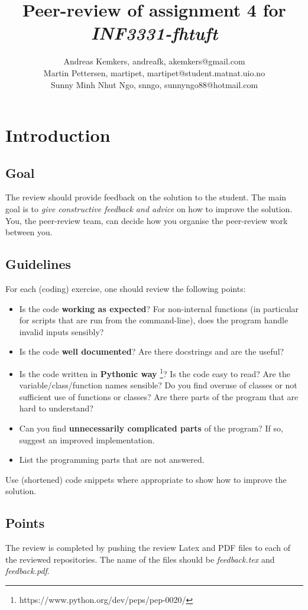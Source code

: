 \documentclass[a4paper]{article}
\title{Peer-review of assignment 4 for \textit{INF3331-fhtuft}}
\author{Andreas Kemkers, andreafk, {akemkers@gmail.com} \\
 		Martin Pettersen, martipet, {martipet@student.matnat.uio.no} \\
		Sunny Minh Nhut Ngo, snngo, {sunnyngo88@hotmail.com}}
\begin{document}
\maketitle

\section{Introduction}
\subsection{Goal}
The review should provide feedback on the solution to the student. The main goal is to \emph{give constructive feedback and advice} on how to improve the solution. You, the peer-review team, can decide how you organise the peer-review work between you. 

\subsection{Guidelines}\label{sec:general_review}
For each (coding) exercise, one should review the following points:

\begin{itemize}
  \item Is the code \textbf{working as expected}? For non-internal functions (in particular for scripts that are run from the command-line), does the program handle invalid inputs sensibly?
  \item Is the code \textbf{well documented}? Are there docstrings and are the useful?
  \item Is the code written in \textbf{Pythonic way} \footnote{https://www.python.org/dev/peps/pep-0020/}? Is the code easy to read? Are the variable/class/function names sensible? Do you find overuse of classes or not sufficient use of functions or classes? Are there parts of the program that are hard to understand? 
  \item Can you find \textbf{unnecessarily complicated parts} of the program? If so, suggest an improved implementation.
  \item List the programming parts that are not answered.
\end{itemize}
Use (shortened) code snippets where appropriate to show how to improve the solution. 

\subsection{Points}
The review is completed by pushing the review Latex and PDF files to each of the reviewed repositories. The name of the files should be \emph{feedback.tex} and \emph{feedback.pdf}.
\end{document}
